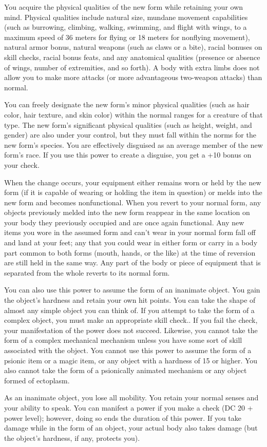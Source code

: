 {	You acquire the physical qualities of the new form while retaining your own mind. Physical qualities include natural size, mundane movement capabilities (such as burrowing, climbing, walking, swimming, and flight with wings, to a maximum speed of 36 meters for flying or 18 meters for nonflying movement), natural armor bonus, natural weapons (such as claws or a bite), racial bonuses on skill checks, racial bonus feats, and any anatomical qualities (presence or absence of wings, number of extremities, and so forth). A body with extra limbs does not allow you to make more attacks (or more advantageous two-weapon attacks) than normal.

	You can freely designate the new form's minor physical qualities (such as hair color, hair texture, and skin color) within the normal ranges for a creature of that type. The new form's significant physical qualities (such as height, weight, and gender) are also under your control, but they must fall within the norms for the new form's species. You are effectively disguised as an average member of the new form's race. If you use this power to create a disguise, you get a +10 bonus on your  check.

	When the change occurs, your equipment either remains worn or held by the new form (if it is capable of wearing or holding the item in question) or melds into the new form and becomes nonfunctional. When you revert to your normal form, any objects previously melded into the new form reappear in the same location on your body they previously occupied and are once again functional. Any new items you wore in the assumed form and can't wear in your normal form fall off and land at your feet; any that you could wear in either form or carry in a body part common to both forms (mouth, hands, or the like) at the time of reversion are still held in the same way. Any part of the body or piece of equipment that is separated from the whole reverts to its normal form.

	You can also use this power to assume the form of an inanimate object. You gain the object's hardness and retain your own hit points. You can take the shape of almost any simple object you can think of. If you attempt to take the form of a complex object, you must make an appropriate skill check.. If you fail the check, your manifestation of the power does not succeed. Likewise, you cannot take the form of a complex mechanical mechanism unless you have some sort of skill associated with the object. You cannot use this power to assume the form of a psionic item or a magic item, or any object with a hardness of 15 or higher. You also cannot take the form of a psionically animated mechanism or any object formed of ectoplasm.

	As an inanimate object, you lose all mobility. You retain your normal senses and your ability to speak. You can manifest a power if you make a  check (DC 20 + power level); however, doing so ends the duration of this power. If you take damage while in the form of an object, your actual body also takes damage (but the object's hardness, if any, protects you).
}